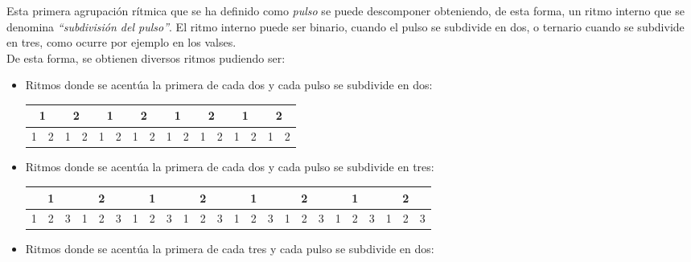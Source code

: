 \documentclass[a4paper, openright, 11pt, titlepage]{report}
\theoremstyle{definition}\newtheorem{defin}[propo]{Definition}
\theoremstyle{definition}\newtheorem{obser}[propo]{Remark}
\theoremstyle{definition}\newtheorem{ejem}[propo]{Ejemplo}
\theoremstyle{definition}\newtheorem{algoritmo}[propo]{Algoritmo}
\begin{document}
Esta primera agrupación rítmica que se ha definido como \textit{pulso} se puede descomponer obteniendo, de esta forma, un ritmo interno que se denomina \textit{``subdivisión del pulso''}. El ritmo interno puede ser binario, cuando el pulso se subdivide en dos, o ternario cuando se subdivide en tres, como ocurre por ejemplo en los valses.\\
De esta forma, se obtienen diversos ritmos pudiendo ser:
\begin{itemize}
    \item Ritmos donde se acentúa la primera de cada dos y cada pulso se subdivide en dos:
    \begin{table}[H]
    \centering
    \begin{tabular}{|c|c|c|c|c|c|c|c|c|c|c|c|c|c|c|c|}
    \hline
        \multicolumn{2}{|c}{\cellcolor{acento}1} & \multicolumn{2}{|c}{2} & \multicolumn{2}{|c}{\cellcolor{acento}1} & \multicolumn{2}{|c}{2} & \multicolumn{2}{|c}{\cellcolor{acento}1} & \multicolumn{2}{|c}{2} & \multicolumn{2}{|c}{\cellcolor{acento}1} & \multicolumn{2}{|c|}{2} \\
        \hline
        \cellcolor{acento}1 & 2 & 1 & 2 & \cellcolor{acento}1 & 2 & 1 & 2 & \cellcolor{acento}1 & 2 & 1 & 2 & \cellcolor{acento}1 & 2 & 1 & 2\\
        \hline
    \end{tabular}
\end{table}
    \item Ritmos donde se acentúa la primera de cada dos y cada pulso se subdivide en tres:
    \begin{table}[H]
    \centering
    \begin{tabular}{|c|c|c|c|c|c|c|c|c|c|c|c|c|c|c|c|c|c|c|c|c|c|c|c|}
    \hline
        \multicolumn{3}{|c}{\cellcolor{acento}1} & \multicolumn{3}{|c}{2} & \multicolumn{3}{|c}{\cellcolor{acento}1} & \multicolumn{3}{|c}{2} & \multicolumn{3}{|c}{\cellcolor{acento}1} & \multicolumn{3}{|c}{2} & \multicolumn{3}{|c}{\cellcolor{acento}1} & \multicolumn{3}{|c|}{2} \\
        \hline
        \cellcolor{acento}1 & 2 & 3 & 1 & 2 & 3 & \cellcolor{acento}1 & 2 & 3 & 1 & 2 & 3 & \cellcolor{acento}1 & 2 & 3 & 1 & 2 & 3 & \cellcolor{acento}1 & 2 & 3 & 1 & 2 & 3 \\
        \hline
    \end{tabular}
\end{table}
    \item Ritmos donde se acentúa la primera de cada tres y cada pulso se subdivide en dos:
    \begin{table}[H]

\end{table}
\end{itemize}
\end{document}
